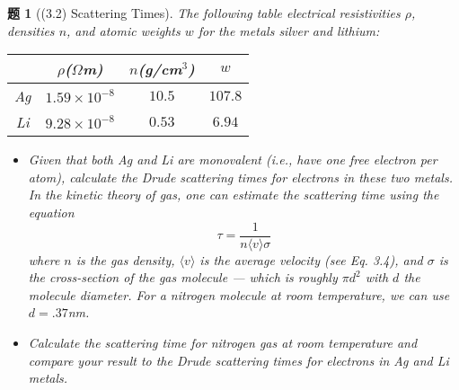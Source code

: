 \documentclass[UTF8,10pt,a4paper]{article}
\theoremstyle{Problem}
\newtheorem{prob}{题}
\theoremstyle{Solution}
\begin{document}
\begin{prob}[(3.2) Scattering Times]
    The following table electrical resistivities $\rho$, densities $n$, and atomic weights $w$ for the metals silver and lithium:
    \begin{table}[h]
        \centering
        \begin{tabular}{cccc}
         & $\rho$($\Omega$m) & $n$(g/cm$^3$) & $w$ \\ \hline
        Ag & $1.59\times 10^{-8}$ & $10.5$ & $107.8$ \\
        Li & $9.28\times 10^{-8}$ & $0.53$ & $6.94$
        \end{tabular}
        \end{table}
        \begin{itemize}
            \item[$\triangleright$] Given that both Ag and Li are monovalent (i.e., have one free electron per atom), calculate the Drude scattering times for electrons in these two metals.\\
            In the kinetic theory of gas, one can estimate the scattering time using the equation
            \[
                \tau=\frac{1}{n\langle v\rangle\sigma}
            \]
            where $n$ is the gas density, $\langle v\rangle$ is the average velocity (see Eq. 3.4), and $\sigma$ is the cross-section of the gas molecule --- which is roughly $\pi d^2$ with $d$ the molecule diameter. For a nitrogen molecule at room temperature, we can use $d=.37$nm.
            \item[$\triangleright$] Calculate the scattering time for nitrogen gas at room temperature and compare your result to the Drude scattering times for electrons in Ag and Li metals.
        \end{itemize}
\end{prob}
\end{document}
